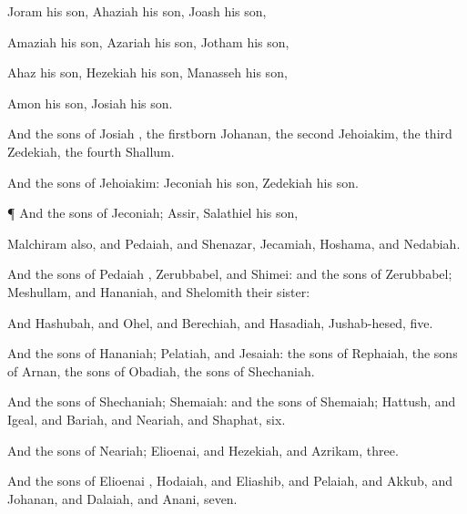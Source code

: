 {Joram his
son,
Ahaziah his
son,
Joash his
son,

Amaziah his
son,
Azariah his
son,
Jotham his
son,

Ahaz his
son,
Hezekiah his
son,
Manasseh his
son,

Amon his
son,
Josiah his
son.

And the
sons of
Josiah
{}, the
firstborn
Johanan, the
second
Jehoiakim, the
third
Zedekiah, the
fourth
Shallum.

And the
sons of
Jehoiakim:
Jeconiah his
son,
Zedekiah his
son.


\par }{\PP {}¶ And the
sons of
Jeconiah;
Assir,
Salathiel his
son,

Malchiram also, and
Pedaiah, and
Shenazar,
Jecamiah,
Hoshama, and
Nedabiah.

And the
sons of
Pedaiah
{},
Zerubbabel, and
Shimei: and the
sons of
Zerubbabel;
Meshullam, and
Hananiah, and
Shelomith their
sister:

And
Hashubah, and
Ohel, and
Berechiah, and
Hasadiah,
Jushab-hesed,
five.

And the
sons of
Hananiah;
Pelatiah, and
Jesaiah: the
sons of
Rephaiah, the
sons of
Arnan, the
sons of
Obadiah, the
sons of
Shechaniah.

And the
sons of
Shechaniah;
Shemaiah: and the
sons of
Shemaiah;
Hattush, and
Igeal, and
Bariah, and
Neariah, and
Shaphat,
six.

And the
sons of
Neariah;
Elioenai, and
Hezekiah, and
Azrikam,
three.

And the
sons of
Elioenai
{},
Hodaiah, and
Eliashib, and
Pelaiah, and
Akkub, and
Johanan, and
Dalaiah, and
Anani,
seven.




\par }
